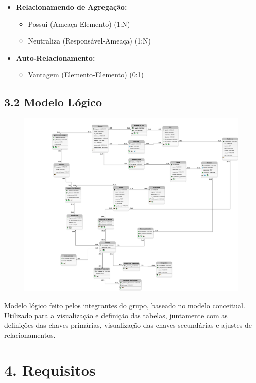 \documentclass[12pt,a4paper]{report}
\begin{document}
\begin{itemize}
  \item \textbf{Relacionamendo de Agregação: }
  \begin{itemize}
        \item Possui (Ameaça-Elemento) (1:N)
        \item Neutraliza (Responsável-Ameaça) (1:N)
  \end{itemize}
  
  \item \textbf{Auto-Relacionamento: }
  \begin{itemize}
      \item Vantagem (Elemento-Elemento) (0:1)
  \end{itemize}

\end{itemize}

\section{3.2 Modelo Lógico}
\begin{figure}[H]
    \centering
    \includegraphics[width=1\textwidth]{Logico.png}
    \label{fig:logico}
\end{figure}
Modelo lógico feito pelos integrantes do grupo, baseado no modelo conceitual. Utilizado para a visualização e definição das tabelas, juntamente com as definições das chaves primárias, visualização das chaves secundárias e ajustes de relacionamentos.

\chapter{4. Requisitos}
\end{document}
